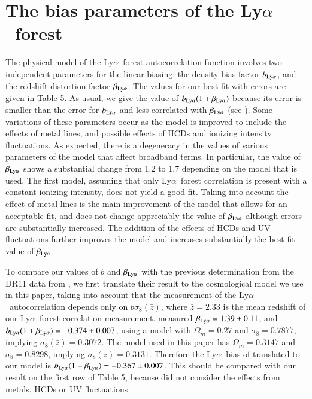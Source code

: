 \documentclass{aa}
\newcommand{\Lya}{Ly$\alpha$~}
\newcommand{\betalya}{\beta_{\rm Ly\alpha}}
\newcommand{\blya}{b_{\rm Ly\alpha}}
\begin{document}
\section{The bias parameters of the \Lya forest}
\label{biassec}


   The physical model of the \Lya forest autocorrelation function involves
two independent parameters for the linear biasing: the density bias factor
$\blya$, and the redshift distortion factor $\betalya$. The values for our best fit
with errors are given in Table 5. As usual, we give the value of
$\blya(1+\betalya)$
because its error is smaller than the error for $\blya$ and less correlated with
$\betalya$ (see \citet{2011JCAP...09..001S}).
Some variations of these parameters occur
as the model is improved to include the effects of metal lines, and possible
effects of HCDs and ionizing intensity fluctuations. As expected, there is
a degeneracy in the values of various parameters of the model that affect
broadband terms. In particular, the value of $\betalya$ shows a substantial
change
from 1.2 to 1.7 depending on the model that is used. The first model,
assuming
that only \Lya forest correlation is present with a constant ionizing
intensity, does not yield a good fit. Taking into account the effect of
metal
lines is the main improvement of the model that allows for an acceptable
fit,
and does not change appreciably the value of $\betalya$ although errors are
substantially increased. The addition of the effects of HCDs and UV
fluctuations further improves the model and increases substantially the best
fit value of $\betalya$.

   To compare our values of $b$ and $\betalya$ with the previous determination
   from the DR11 data from  \citet{2015JCAP...11..034B},
     we first translate their
result
to the cosmological model we use in this paper, taking into account that the
measurement of the \Lya autocorrelation depends only on $b\sigma_8(\bar z)$,
where $\bar z=2.33$ is the mean redshift of our \Lya forest correlation
measurement. \citet{2015JCAP...11..034B} measured $\betalya=1.39 \pm 0.11$, and
$\blya(1+\betalya)=-0.374\pm 0.007$, using a model with $\Omega_m=0.27$ and
$\sigma_8=0.7877$,
implying $\sigma_8(\bar z)=0.3072$. The model used in this paper has
$\Omega_m=0.3147$ and $\sigma_8=0.8298$,
implying $\sigma_8(\bar{z})=0.3131$.
Therefore the \Lya bias of \citet{2015JCAP...11..034B}
translated to our model is
$\blya(1+\betalya)=-0.367 \pm 0.007$.
This should be compared with our result on the first row of Table 5,
because \citet{2015JCAP...11..034B} did not consider the effects from metals,
HCDs or UV fluctuations
\end{document}
